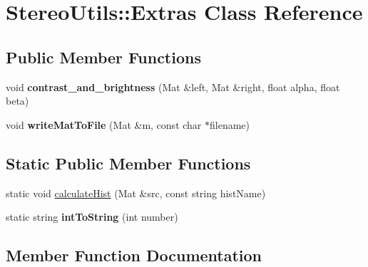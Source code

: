 \hypertarget{class_stereo_utils_1_1_extras}{}\section{Stereo\+Utils\+:\+:Extras Class Reference}
\label{class_stereo_utils_1_1_extras}
\subsection*{Public Member Functions}
\begin{DoxyCompactItemize}
\item 
void {\bfseries contrast\+\_\+and\+\_\+brightness} (Mat \&left, Mat \&right, float alpha, float beta)\hypertarget{class_stereo_utils_1_1_extras_a6cefe41a723177e28963a6e5321dfa8f}{}\label{class_stereo_utils_1_1_extras_a6cefe41a723177e28963a6e5321dfa8f}

\item 
void {\bfseries write\+Mat\+To\+File} (Mat \&m, const char $\ast$filename)\hypertarget{class_stereo_utils_1_1_extras_a28415b181f246a77a5529019d99dfaab}{}\label{class_stereo_utils_1_1_extras_a28415b181f246a77a5529019d99dfaab}

\end{DoxyCompactItemize}
\subsection*{Static Public Member Functions}
\begin{DoxyCompactItemize}
\item 
static void \hyperlink{class_stereo_utils_1_1_extras_a94c111c1dec53fc39c24f42d26e98815}{calculate\+Hist} (Mat \&src, const string hist\+Name)
\item 
static string {\bfseries int\+To\+String} (int number)\hypertarget{class_stereo_utils_1_1_extras_a9d9937dd742a906f8ecd6bfad9123a00}{}\label{class_stereo_utils_1_1_extras_a9d9937dd742a906f8ecd6bfad9123a00}

\end{DoxyCompactItemize}


\subsection{Member Function Documentation}
